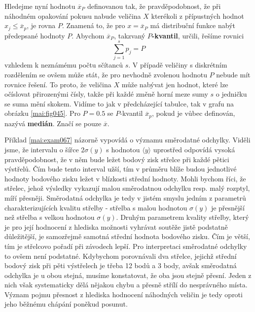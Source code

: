     Hledejme nyní hodnotu \(\overline{x}_P\) definovanou tak, že pravděpodobnost, že při náhodném 
    opakování pokusu nabude veličina \(X\) kterékoli z přípustných hodnot \(x_j \leq 
    \overline{x}_p\), je rovna \(P\). Znamená to, že pro \(x = \overline{x}_P\) má distribuční 
    funkce nabýt předepsané hodnoty \(P\). Abychom \(\overline{x}_P\), takzvaný 
    \(P\)\textbf{-kvantil}, určili, řešíme rovnici
    \begin{equation}\label{mai:eq064}
      \sum_{j=1}^{s}p_j = P
    \end{equation}
    vzhledem k neznámému počtu sčítanců \(s\). V případě veličiny s diskrétním rozdělením se ovšem
    může stát, že pro nevhodně zvolenou hodnotu \(P\) nebude mít rovnice řešení. To proto, že 
    veličina \(X\) může nabývat jen hodnot, které lze očíslovat přirozenými čísly, takže při každé 
    změně horní meze sumy \(s\) o jedničku se suma mění skokem. Vidíme to jak v předcházející 
    tabulce, tak v grafu na obrázku \ref{mai:fig045}. Pro \(P = \num{0.5}\) se \(P\)-kvantil 
    \(\overline{x}_p\), pokud je vůbec definován, nazývá \textbf{medián}. Značí se pouze 
    \(\overline{x}\).

    
    
    Příklad \ref{mai:exam067} názorně vypovídá o významu směrodatné odchylky. Viděli jsme, že 
    intervalu o šířce \(2\sigma(y)\) s hodnotou \(\langle y \rangle\) uprostřed odpovídá vysoká 
    pravděpodobnost, že v něm bude ležet bodový zisk střelce při každé pětici výstřelů. Čím bude 
    tento interval užší, tím v průměru blíže budou jednotlivé hodnoty bodového zisku ležet v 
    blízkosti střední hodnoty. Mohli bychom říci, že střelec, jehož výsledky vykazují malou 
    směrodatnou odchylku resp. malý rozptyl, míří přesněji. Směrodatná odchylka je tedy v jistém 
    smyslu jedním z parametrů charakterizujících kvalitu střelby - střelba s malou hodnotou  
    \(\sigma(y)\) je přesnější než střelba s velkou hodnotou \(\sigma(y)\). Druhým parametrem 
    kvality střelby, který je pro její hodnocení z hlediska možnosti vyhrávat soutěže jistě 
    podstatně důležitější, je samozřejmě samotná střední hodnota bodového zisku. Čím je větší, tím 
    je střelcovo pořadí při závodech lepší. Pro interpretaci směrodatné odchylky to ovšem není 
    podstatné. Kdybychom porovnávali dva střelce, jejichž střední bodový zisk při
    pěti výstřelech je třeba \num{12} bodů a \num{3} body, avšak směrodatná odchylka je u obou 
    stejná, musíme konstatovat, že oba jsou stejně přesní. Jeden z nich však systematicky dělá 
    nějakou chybu a přesně střílí do nesprávného místa. Význam pojmu přesnost z hlediska hodnocení 
    náhodných veličin je tedy oproti jeho běžnému chápání poněkud posunut.
    
